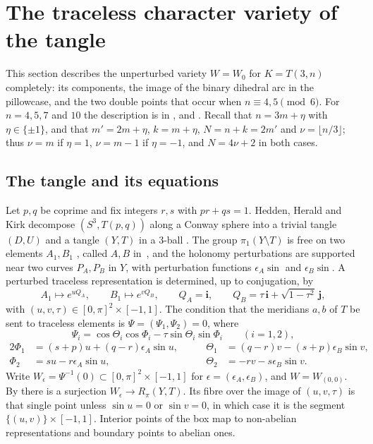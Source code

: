 \section{The traceless character variety of the tangle}\label{sec:variety}

This section describes the unperturbed variety $W=W_0$ for $K=T(3,n)$ completely: its components, the
image of the binary dihedral arc in the pillowcase, and the two double points that occur when
$n\equiv4,5\pmod 6$. For $n=4,5,7$ and $10$ the description is in \cite[\S11]{HHK1}, \cite[\S11]{HHK2} and
\cite[\S4]{FKP}. Recall that $n=3m+\eta$ with $\eta\in\{\pm1\}$, and that $m'=2m+\eta$, $k=m+\eta$, $N=n+k=2m'$ and
$\nu=\lfloor n/3\rfloor$; thus $\nu=m$ if $\eta=1$, $\nu=m-1$ if $\eta=-1$, and $N=4\nu+2$ in both cases.

\subsection{The tangle and its equations}\label{sec:tangle}

Let $p,q$ be coprime and fix integers $r,s$ with $pr+qs=1$. Hedden, Herald and Kirk decompose
$(S^3,T(p,q))$ along a Conway sphere into a trivial tangle $(D,U)$ and a tangle $(Y,T)$ in a $3$-ball
\cite[\S10]{HHK2}. The group $\pi_1(Y\setminus T)$ is free on two elements $A_1,B_1$ \cite[\S10]{HHK2}, called $A,B$ in~\cite[\S11]{HHK1}, and the
holonomy perturbations are supported near two curves $P_A,P_B$ in $Y$, with perturbation functions
$\epsilon_A\sin$ and $\epsilon_B\sin$. A perturbed traceless representation is determined, up to conjugation, by
\[
A_1\mapsto e^{uQ_A},\qquad B_1\mapsto e^{vQ_B},\qquad Q_A=\mathbf i,\qquad Q_B=\tau\,\mathbf i+\sqrt{1-\tau^2}\,\mathbf j,
\]
with $(u,v,\tau)\in[0,\pi]^2\times[-1,1]$. The condition that the meridians $a,b$ of $T$ be sent to traceless
elements is $\Psi=(\Psi_1,\Psi_2)=0$, where \cite[(33)--(34)]{HHK2}
\begin{equation}\label{eq:Psi}
\Psi_i=\cos\Theta_i\cos\Phi_i-\tau\sin\Theta_i\sin\Phi_i\qquad(i=1,2),
\end{equation}
\begin{alignat*}{2}
\Phi_1&=(s+p)u+(q-r)\epsilon_A\sin u,&\qquad \Theta_1&=(q-r)v-(s+p)\epsilon_B\sin v,\\
\Phi_2&=su-r\epsilon_A\sin u,&\qquad \Theta_2&=-rv-s\epsilon_B\sin v .
\end{alignat*}
Write $W_\epsilon=\Psi^{-1}(0)\subset[0,\pi]^2\times[-1,1]$ for $\epsilon=(\epsilon_A,\epsilon_B)$, and $W=W_{(0,0)}$. By
\cite[Thm.~10.2]{HHK2} there is a surjection $W_\epsilon\to R_\pi(Y,T)$. Its fibre over the image of $(u,v,\tau)$ is that single
point unless $\sin u=0$ or $\sin v=0$, in which case it is the segment $\{(u,v)\}\times[-1,1]$. Interior points of
the box map to non-abelian representations and boundary points to abelian ones.


